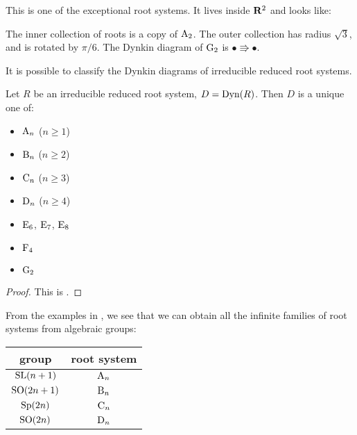 \begin{example}
This is one of the exceptional root systems. It lives inside $\mathbf{R}^2$ and looks 
like:
\begin{center}
\end{center}
The inner collection of roots is a copy of $\mathrm{A}_2$. The outer collection 
has radius $\sqrt 3$, and is rotated by $\pi/6$. The Dynkin diagram of 
$\mathrm{G}_2$ is $\bullet \Rrightarrow \bullet$. 
\end{example}

It is possible to classify the Dynkin diagrams of irreducible reduced root 
systems. 

\begin{theorem}
Let $R$ be an irreducible reduced root system, $D=\operatorname{Dyn}(R)$. Then $D$ is a 
unique one of: 
\begin{itemize}
  \item $\mathrm{A}_n$ ($n\geqslant 1$)
  \item $\mathrm{B}_n$ ($n\geqslant 2$)
  \item $\mathrm{C}_n$ ($n\geqslant 3$)
  \item $\mathrm{D}_n$ ($n\geqslant 4$)
  \item $\mathrm{E}_6$, $\mathrm{E}_7$, $\mathrm{E}_8$
  \item $\mathrm{F}_4$
  \item $\mathrm{G}_2$
\end{itemize}
\end{theorem}
\begin{proof}
This is \cite[VI \S 4.2 th.3]{bourbaki-lie-alg-4-6}. 
\end{proof}

From the examples in \cite[Ch.23]{milne-iAG}, we see that we can obtain all 
the infinite families of root systems from algebraic groups:
\begin{center}
\begin{tabular}{c|c}
  group & root system \\ \hline
  $\operatorname{SL}(n+1)$  & $\mathrm{A}_n$ \\
  $\operatorname{SO}(2n+1)$ & $\mathrm{B}_n$ \\
  $\operatorname{Sp}(2n)$   & $\mathrm{C}_n$ \\
  $\operatorname{SO}(2n)$   & $\mathrm{D}_n$ 
\end{tabular}
\end{center}

